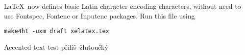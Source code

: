 \documentclass{article}
\def\ahoj{příliš}
\begin{document}
\LaTeX\ now defines basic Latin character encoding characters, without need to use Fontspec, Fontenc or Inputenc packages. Run this file using

\begin{verbatim}
make4ht -uxm draft xelatex.tex
\end{verbatim}

Accented text test
\ahoj\ žluťoučký
\end{document}
